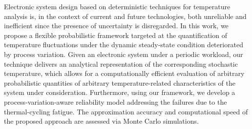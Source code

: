 Electronic system design based on deterministic techniques for temperature analysis is, in the context of current and future technologies, both unreliable and inefficient since the presence of uncertainty is disregarded.
In this work, we propose a flexible probabilistic framework targeted at the quantification of temperature fluctuations under the dynamic steady-state condition deteriorated by process variation.
Given an electronic system under a periodic workload, our technique delivers an analytical representation of the corresponding stochastic temperature, which allows for a computationally efficient evaluation of arbitrary probabilistic quantities of arbitrary temperature-related characteristics of the system under consideration.
Furthermore, using our framework, we develop a process-variation-aware reliability model addressing the failures due to the thermal-cycling fatigue.
The approximation accuracy and computational speed of the proposed approach are assessed via Monte Carlo simulations.
